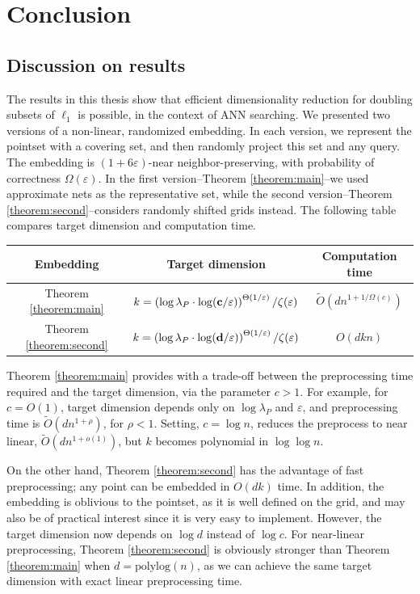 \documentclass[10pt,a4paper,twoside]{book}
\newcommand{\mbf}[1]{\mbox{\boldmath$\rm{#1}$}}
\newcommand{\eps}{\varepsilon}
\theoremstyle{definition}
\theoremstyle{remark}
\begin{document}
\clearpage
\thispagestyle{empty}
\chapter{Conclusion}
\section*{Discussion on results}
The results in this thesis show that efficient dimensionality reduction for doubling subsets of $\ell_1$ is possible, in the context of ANN searching. We presented two versions of a non-linear, randomized embedding. In each version, we represent the pointset with a covering set, and then randomly project this set and any query. The embedding is $(1{+}6\eps)$-near neighbor-preserving, with probability of correctness $\Omega(\eps)$. In the first version--Theorem \ref{theorem:main}--we used approximate nets as the representative set, while the second version--Theorem \ref{theorem:second}--considers randomly shifted grids instead. The following table compares target dimension and computation time.
{ \renewcommand{\arraystretch}{1.4}
\begin{center}
\begin{tabular}{|c|c|c|}
\hline
Embedding & Target dimension &  Computation time  \\
\hline 
Theorem \ref{theorem:main}  & $k = \left( \log{\lambda_P} \cdot \log(\mbf{c} / \eps) \right)^{\Theta(1/\eps)} / \zeta(\eps) $ &  $\tilde{O}(dn^{1+1/ \Omega(c)})$ \\
\hline
Theorem \ref{theorem:second} & $k = \left( \log{\lambda_P} \cdot \log(\mbf{d} / \eps) \right)^{\Theta(1/\eps)} / \zeta(\eps) $  &  $O(dkn)$  \\
\hline 
\end{tabular}
\end{center}
}
Theorem \ref{theorem:main} provides with a trade-off between the preprocessing time required and the target dimension, via the parameter $c >1$. For example, for $c=O(1)$, target dimension depends only on $\log{\lambda_P}$ and $\eps$, and preprocessing time is $\tilde{O}(dn^{1+\rho})$, for $\rho <1$. Setting, $c = \log n$, reduces the preprocess to near linear, $\tilde{O}(dn^{1+o(1)})$, but $k$ becomes polynomial in $\log \log n$.

On the other hand, Theorem \ref{theorem:second} has the advantage of fast preprocessing; any point can be embedded in $O(dk)$ time. In addition, the embedding is oblivious to the pointset, as it is well defined on the grid, and may also be of practical interest since it is very easy to implement. However, the target dimension now depends on $\log d$ instead of $\log c$. For near-linear preprocessing, Theorem \ref{theorem:second} is obviously stronger than Theorem \ref{theorem:main} when $d = \mathrm{polylog}(n)$, as we can achieve the same target dimension with exact linear preprocessing time.
\end{document}
